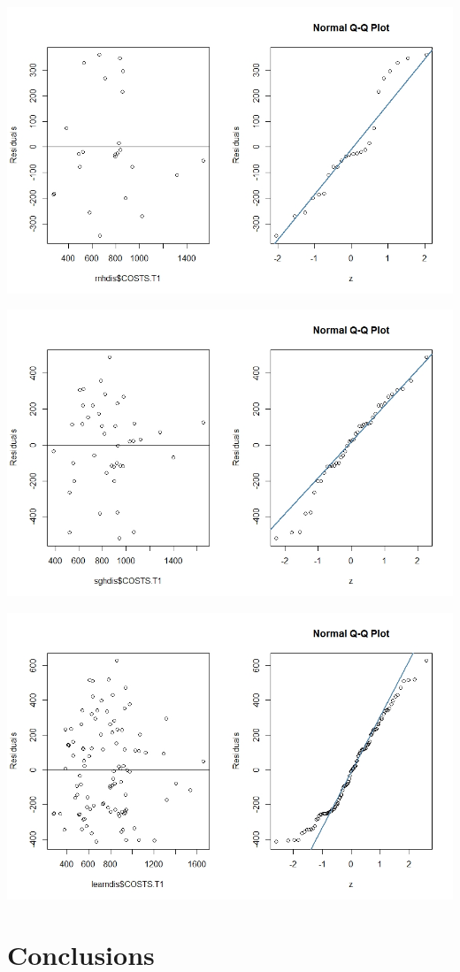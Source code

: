 \documentclass[]{article}
\begin{document}
\centering
\includegraphics[width=\textwidth]{RStudio/jpeg/Res_RNH.jpeg}
\raggedright


\centering
\includegraphics[width=\textwidth]{RStudio/jpeg/Res_SGH.jpeg}
\raggedright


\centering
\includegraphics[width=\textwidth]{RStudio/jpeg/Res_COST.jpeg}
\raggedright

\section{Conclusions}
\end{document}
